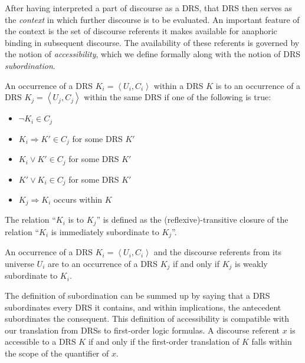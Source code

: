After having interpreted a part of discourse as a DRS, that DRS then serves
as the \emph{context} in which further discourse is to be evaluated. An
important feature of the context is the set of discourse referents it makes
available for anaphoric binding in subsequent discourse. The availability
of these referents is governed by the notion of \emph{accessibility}, which
we define formally along with the notion of DRS
\emph{subordination}.

\begin{definition}
  An occurrence of a DRS $K_i = \left< U_i, C_i \right>$ within a DRS $K$
  is  to an occurrence of a DRS
  $K_j = \left< U_j, C_j \right>$ within the same DRS if one of the
  following is true:

  \begin{itemize}
  \item $\lnot K_i \in C_j$
  \item $K_i \Rightarrow K' \in C_j$ for some DRS $K'$
  \item $K_i \lor K' \in C_j$ for some DRS $K'$
  \item $K' \lor K_i \in C_j$ for some DRS $K'$
  \item $K_j \Rightarrow K_i$ occurs within $K$
  \end{itemize}
\end{definition}

\begin{definition}
  The relation ``$K_i$ is  to $K_j$'' is
  defined as the (reflexive)-transitive closure of the relation ``$K_i$ is
  immediately subordinate to $K_j$''.
\end{definition}

\begin{definition}
  An occurrence of a DRS $K_i = \left< U_i, C_i \right>$ and the discourse
  referents from its universe $U_i$ are  to an occurrence
  of a DRS $K_j$ if and only if $K_j$ is weakly subordinate to $K_i$.
\end{definition}

The definition of subordination can be summed up by saying that a DRS
subordinates every DRS it contains, and within implications, the antecedent
subordinates the consequent. This definition of accessibility is compatible
with our translation from DRSs to first-order logic formulas. A discourse
referent $x$ is accessible to a DRS $K$ if and only if the first-order
translation of $K$ falls within the scope of the quantifier of $x$.

